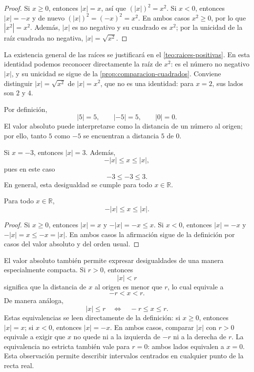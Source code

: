 \begin{proof}
Si $x\geq0$, entonces $|x|=x$, así que $(|x|)^2=x^2$. Si $x<0$, entonces $|x|=-x$ y de nuevo $(|x|)^2=(-x)^2=x^2$. En ambos casos $x^2\geq0$, por lo que $|x^2|=x^2$. Además, $|x|$ es no negativo y su cuadrado es $x^2$; por la unicidad de la raíz cuadrada no negativa, $|x|=\sqrt{x^2}$.
\end{proof}

La existencia general de las raíces se justificará en el \cref{teo:raices-positivas}. En esta identidad podemos reconocer directamente la raíz de $x^2$: es el número no negativo $|x|$, y su unicidad se sigue de la \cref{prop:comparacion-cuadrados}. Conviene distinguir $|x|=\sqrt{x^2}$ de $|x|=x^2$, que no es una identidad: para $x=2$, sus lados son $2$ y $4$.

\begin{example}
Por definición,
\[
|5|=5,\qquad |-5|=5,\qquad |0|=0.
\]
El valor absoluto puede interpretarse como la distancia de un número al origen; por ello, tanto $5$ como $-5$ se encuentran a distancia $5$ de $0$.
\end{example}

\begin{example}
Si $x=-3$, entonces $|x|=3$. Además,
\[
-|x|\leq x\leq |x|,
\]
pues en este caso
\[
-3\leq -3\leq3.
\]
En general, esta desigualdad se cumple para todo $x\in\mathbb{R}$.
\end{example}

\begin{samepage}
\begin{proposition}
\label{prop:cotas-absoluto}
Para todo $x\in\mathbb{R}$,
\[
-|x|\leq x\leq |x|.
\]
\end{proposition}
\end{samepage}

\begin{proof}
Si $x\geq0$, entonces $|x|=x$ y $-|x|=-x\leq x$. Si $x<0$, entonces $|x|=-x$ y $-|x|=x\leq -x=|x|$. En ambos casos la afirmación sigue de la definición por casos del valor absoluto y del orden usual.
\end{proof}

El valor absoluto también permite expresar desigualdades de una manera especialmente compacta. Si $r>0$, entonces
\[
|x|<r
\]
significa que la distancia de $x$ al origen es menor que $r$, lo cual equivale a
\[
-r<x<r.
\]
De manera análoga,
\[
|x|\leq r\quad\Longleftrightarrow\quad -r\leq x\leq r.
\]
Estas equivalencias se leen directamente de la definición: si $x\geq0$, entonces $|x|=x$; si $x<0$, entonces $|x|=-x$. En ambos casos, comparar $|x|$ con $r>0$ equivale a exigir que $x$ no quede ni a la izquierda de $-r$ ni a la derecha de $r$.
La equivalencia no estricta también vale para $r=0$: ambos lados equivalen a $x=0$.
Esta observación permite describir intervalos centrados en cualquier punto de la recta real.

